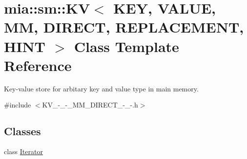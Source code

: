 \hypertarget{classmia_1_1sm_1_1_k_v_3_01_k_e_y_00_01_v_a_l_u_e_00_01_m_m_00_01_d_i_r_e_c_t_00_01_r_e_p_l_a_c_e_m_e_n_t_00_01_h_i_n_t_01_4}{\section{mia\-:\-:sm\-:\-:K\-V$<$ K\-E\-Y, V\-A\-L\-U\-E, M\-M, D\-I\-R\-E\-C\-T, R\-E\-P\-L\-A\-C\-E\-M\-E\-N\-T, H\-I\-N\-T $>$ Class Template Reference}
\label{classmia_1_1sm_1_1_k_v_3_01_k_e_y_00_01_v_a_l_u_e_00_01_m_m_00_01_d_i_r_e_c_t_00_01_r_e_p_l_a_c_e_m_e_n_t_00_01_h_i_n_t_01_4}
}


Key-\/value store for arbitary key and value type in main memory.  




{\ttfamily \#include $<$K\-V\-\_\--\/\-\_\--\/\-\_\-\-M\-M\-\_\-\-D\-I\-R\-E\-C\-T\-\_\--\/\-\_\--\/.\-h$>$}

\subsection*{Classes}
\begin{DoxyCompactItemize}
\item 
class \hyperlink{classmia_1_1sm_1_1_k_v_3_01_k_e_y_00_01_v_a_l_u_e_00_01_m_m_00_01_d_i_r_e_c_t_00_01_r_e_p_l_a_c_6d8fd61b5ec60406ef5a5d4939c75a12}{Iterator}
\end{DoxyCompactItemize}
